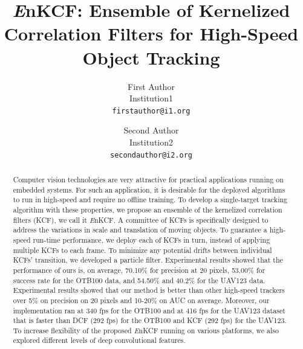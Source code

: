 \documentclass[10pt,twocolumn,letterpaper]{article}
\begin{document}
\title{{\it E}nKCF: Ensemble of Kernelized Correlation Filters for
  High-Speed Object Tracking}

\author{First Author \\
Institution1\\
{\tt\small firstauthor@i1.org}
\and
Second Author \\
Institution2\\
{\tt\small secondauthor@i2.org}
}

\maketitle
\ifwacvfinal\thispagestyle{empty}\fi

\begin{abstract}
Computer vision technologies are very attractive for practical
applications running on embedded systems. For such an application, it
is desirable for the deployed algorithms to run in high-speed and
require no offline training. To develop a single-target tracking
algorithm with these properties, we propose an ensemble of the
kernelized correlation filters (KCF), we call it {\it E}nKCF. A
committee of KCFs is specifically designed to address the variations
in scale and translation of moving objects. To guarantee a high-speed
run-time performance, we deploy each of KCFs in turn, instead of
applying multiple KCFs to each frame. To minimize any potential drifts
between individual KCFs' transition, we developed a particle
filter. Experimental results showed that the performance of ours is,
on average, 70.10\% for precision at 20 pixels, 53.00\% for success
rate for the OTB100 data, and 54.50\% and 40.2\% for the UAV123
data. Experimental results showed that our method is better than other
high-speed trackers over 5\% on precision on 20 pixels and 10-20\% on
AUC on average. Moreover, our implementation ran at 340 fps for the
OTB100 and at 416 fps for the UAV123 dataset that is faster than DCF
(292 fps) for the OTB100 and KCF (292 fps) for the UAV123. To increase
flexibility of the proposed {\it E}nKCF running on various platforms,
we also explored different levels of deep convolutional features.
\end{abstract}
\end{document}
